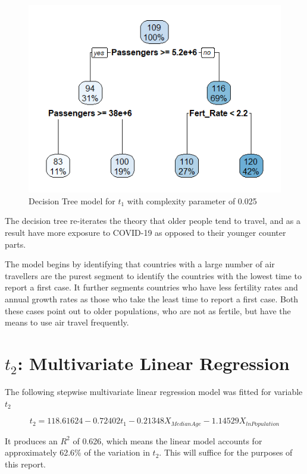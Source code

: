 \documentclass[]{report}
\begin{document}
\begin{figure}[htb]
	\centering
	\caption{Decision Tree model for $t_1$ with complexity parameter of 0.025 }
	\includegraphics{tree.png}
\end{figure}


The decision tree re-iterates the theory that older people tend to travel, and as a result have more exposure to COVID-19 as opposed to their younger counter parts. 

The model begins by identifying that countries with a large number of air travellers are the purest segment to identify the countries with the lowest time to report a first case. It further segments countries who have less fertility rates and annual growth rates as those who take the least time to report a first case. Both these cases point out to older populations, who are not as fertile, but have the means to use air travel frequently.

\newpage

\section{$t_2$: Multivariate Linear Regression}

The following stepwise multivariate linear regression model was fitted for variable $t_2$

$$t_2 = 118.61624 -0.72402 t_1 - 0.21348 X_{Median Age} -1.14529 X_{lnPopulation}$$

It produces an $R^2$ of 0.626, which means the linear model accounts for approximately 62.6\% of the variation in $t_2$. This will suffice for the purposes of this report.
\end{document}
